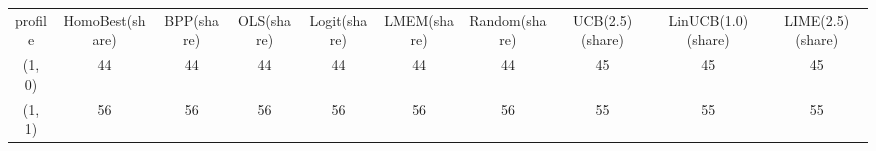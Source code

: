 \begin{tabular}{cccccccccc}
profile & HomoBest(share) & BPP(share) & OLS(share) & Logit(share) & LMEM(share) & Random(share) & UCB(2.5)(share) & LinUCB(1.0)(share) & LIME(2.5)(share)\\
(1, 0) & 44 & 44 & 44 & 44 & 44 & 44 & 45 & 45 & 45\\
(1, 1) & 56 & 56 & 56 & 56 & 56 & 56 & 55 & 55 & 55\\
\end{tabular}
